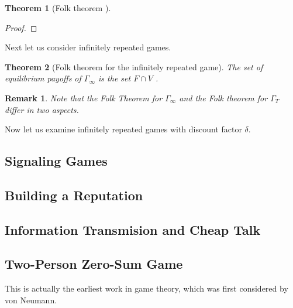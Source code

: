 \documentclass{article}
\newtheorem{Thm}{Theorem}[section]
\newtheorem*{Rk}{Remark}
\theoremstyle{definition}
\begin{document}
\begin{Thm}[Folk theorem ]
    
\end{Thm}
\begin{proof}
    
\end{proof}

Next let us consider infinitely repeated games.
\begin{Thm}[Folk theorem for the infinitely repeated game]
    The set of equilibrium payoffs of $\Gamma_\infty$ is the set $F \cap V$ .
\end{Thm}
\begin{Rk}
    Note that the Folk Theorem for $\Gamma_\infty$ and the Folk theorem for $\Gamma_T$ differ in two aspects.
\end{Rk}

Now let us examine infinitely repeated games with discount factor $\delta$.

\subsection{Signaling Games}


\subsection{Building a Reputation}

\subsection{Information Transmision and Cheap Talk}

\subsection{Two-Person Zero-Sum Game}
This is actually the earliest work in game theory, which was first considered by von Neumann.
\end{document}
